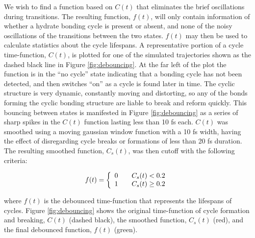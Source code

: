 We wish to find a function based on $C(t)$ that eliminates the brief oscillations during transitions. The resulting function, $f(t)$, will only contain information of whether a hydrate bonding cycle is present or absent, and none of the noisy oscillations of the transitions between the two states. $f(t)$ may then be used to calculate statistics about the cycle lifespans. A representative portion of a cycle time-function, $C(t)$, is plotted for one of the simulated trajectories shown as the dashed black line in Figure \ref{fig:debouncing}. At the far left of the plot the function is in the ``no cycle'' state indicating that a bonding cycle has not been detected, and then switches ``on'' as a cycle is found later in time. The cyclic structure is very dynamic, constantly moving and distorting, so any of the bonds forming the cyclic bonding structure are liable to break and reform quickly. This bouncing between states is manifested in Figure \ref{fig:debouncing} as a series of sharp spikes in the $C(t)$ function lasting less than 10 fs each. $C(t)$ was smoothed using a moving gaussian window function with a 10 fs width, having the effect of disregarding cycle breaks or formations of less than 20 fs duration. The resulting smoothed function, $C_s(t)$, was then cutoff with the following criteria:

\[
  f(t) = \left\{ 
  \begin{array}{l l}
    0 & \quad C_s(t) < 0.2\\
    1 & \quad C_s(t) \geq 0.2\\
  \end{array} \right.
\]

where $f(t)$ is the debounced time-function that represents the lifespans of cycles. Figure \ref{fig:debouncing} shows the original time-function of cycle formation and breaking, $C(t)$ (dashed black), the smoothed function, $C_s(t)$ (red), and the final debounced function, $f(t)$ (green).

